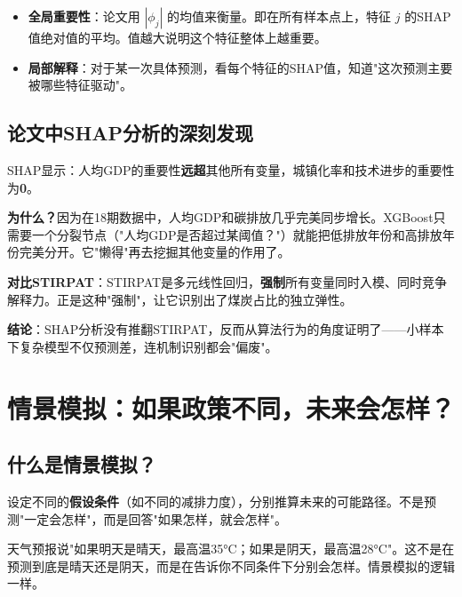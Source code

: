 \documentclass[12pt, a4paper]{article}
\begin{document}
\begin{itemize}[leftmargin=2em]
\item \textbf{全局重要性}：论文用 $|\phi_j|$ 的均值来衡量。即在所有样本点上，特征 $j$ 的SHAP值绝对值的平均。值越大说明这个特征整体上越重要。
\item \textbf{局部解释}：对于某一次具体预测，看每个特征的SHAP值，知道"这次预测主要被哪些特征驱动"。
\end{itemize}

\subsection{论文中SHAP分析的深刻发现}

\begin{purplebox}[SHAP揭示了XGBoost的"懒惰"]
SHAP显示：人均GDP的重要性\textbf{远超}其他所有变量，城镇化率和技术进步的重要性为\textbf{0}。

\textbf{为什么？}因为在18期数据中，人均GDP和碳排放几乎完美同步增长。XGBoost只需要一个分裂节点（"人均GDP是否超过某阈值？"）就能把低排放年份和高排放年份完美分开。它"懒得"再去挖掘其他变量的作用了。

\textbf{对比STIRPAT}：STIRPAT是多元线性回归，\textbf{强制}所有变量同时入模、同时竞争解释力。正是这种"强制"，让它识别出了煤炭占比的独立弹性。

\textbf{结论}：SHAP分析没有推翻STIRPAT，反而从算法行为的角度证明了——小样本下复杂模型不仅预测差，连机制识别都会"偏废"。
\end{purplebox}

\section{情景模拟：如果政策不同，未来会怎样？}

\subsection{什么是情景模拟？}

\begin{conceptbox}[情景模拟]
设定不同的\textbf{假设条件}（如不同的减排力度），分别推算未来的可能路径。不是预测"一定会怎样"，而是回答"如果怎样，就会怎样"。
\end{conceptbox}

\begin{examplebox}[类比]
天气预报说"如果明天是晴天，最高温35°C；如果是阴天，最高温28°C"。这不是在预测到底是晴天还是阴天，而是在告诉你不同条件下分别会怎样。情景模拟的逻辑一样。
\end{examplebox}
\end{document}
